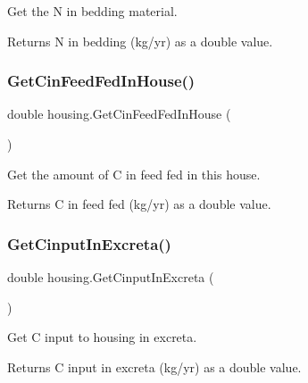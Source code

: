 Get the N in bedding material. 

\begin{DoxyReturn}{Returns}
N in bedding (kg/yr) as a double value. 
\end{DoxyReturn}
\mbox{\label{classhousing_aa7dc2d7cb586625504b95939abb32748}} 
\subsubsection{\texorpdfstring{GetCinFeedFedInHouse()}{GetCinFeedFedInHouse()}}
{\footnotesize\ttfamily double housing.\+Get\+Cin\+Feed\+Fed\+In\+House (\begin{DoxyParamCaption}{ }\end{DoxyParamCaption})\hspace{0.3cm}{\ttfamily [inline]}}



Get the amount of C in feed fed in this house. 

\begin{DoxyReturn}{Returns}
C in feed fed (kg/yr) as a double value. 
\end{DoxyReturn}
\mbox{\label{classhousing_ae973f720e70941908e38c803568d5d6c}} 
\subsubsection{\texorpdfstring{GetCinputInExcreta()}{GetCinputInExcreta()}}
{\footnotesize\ttfamily double housing.\+Get\+Cinput\+In\+Excreta (\begin{DoxyParamCaption}{ }\end{DoxyParamCaption})\hspace{0.3cm}{\ttfamily [inline]}}



Get C input to housing in excreta. 

\begin{DoxyReturn}{Returns}
C input in excreta (kg/yr) as a double value. 
\end{DoxyReturn}
\mbox{\label{classhousing_ac6b99e9bf54af3c08b8cf0b6ba63c6f2}} 
